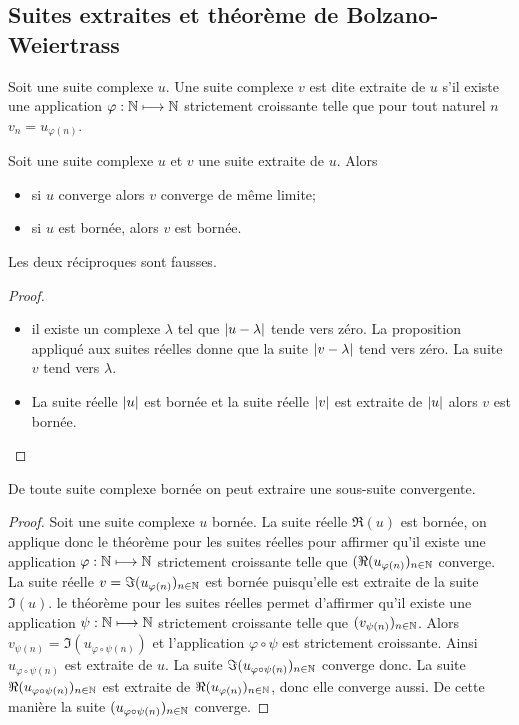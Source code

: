 \subsection{Suites extraites et théorème de Bolzano-Weiertrass}
\begin{defdef}
  Soit une suite complexe \(u\). Une suite complexe \(v\) est dite extraite de \(u\) s'il existe une application \(\varphi:\mathbb{N} \longmapsto \mathbb{N}\) strictement croissante telle que pour tout naturel \(n\) \(v_n = u_{\varphi(n)}\).
\end{defdef}
\begin{prop}
  Soit une suite complexe \(u\) et \(v\) une suite extraite de \(u\). Alors
  \begin{itemize}
  \item si \(u\) converge alors \(v\) converge de même limite;
  \item si \(u\) est bornée, alors \(v\) est bornée.
  \end{itemize}
  Les deux réciproques sont fausses.
\end{prop}
\begin{proof}
  \begin{itemize}
  \item il existe un complexe \(\lambda\) tel que \(\left\lvert u-\lambda\right\rvert\) tende vers zéro. La proposition appliqué aux suites réelles donne que la suite \(\left\lvert v-\lambda\right\rvert\) tend vers zéro. La suite \(v\) tend vers \(\lambda\).
  \item La suite réelle \(\left\lvert u\right\rvert\) est bornée et la suite réelle \(\left\lvert v\right\rvert\) est extraite de \(\left\lvert u\right\rvert\) alors \(v\) est bornée.
  \end{itemize}
\end{proof}
\begin{theo}
  De toute suite complexe bornée on peut extraire une sous-suite convergente.
\end{theo}
\begin{proof}
  Soit une suite complexe \(u\) bornée. La suite réelle \(\Re(u)\) est bornée, on applique donc le théorème pour les suites réelles pour affirmer qu'il existe une application \(\varphi:\mathbb{N} \longmapsto \mathbb{N}\) strictement croissante telle que \((\Re(u_{\varphi(n)})_{n \in \mathbb{N}}\) converge. La suite réelle \(v = \Im(u_{\varphi(n)})_{n \in \mathbb{N}}\) est bornée puisqu'elle est extraite de la suite \(\Im(u)\). le théorème pour les suites réelles permet d'affirmer qu'il existe une application \(\psi:\mathbb{N} \longmapsto \mathbb{N}\) strictement croissante telle que \((v_{\psi(n)})_{n \in \mathbb{N}}\). Alors \(v_{\psi(n)} = \Im(u_{\varphi \circ \psi(n)})\) et l'application \(\varphi \circ \psi\) est strictement croissante. Ainsi \(u_{\varphi \circ \psi(n)}\) est extraite de \(u\). La suite \(\Im(u_{\varphi \circ \psi(n)})_{n \in \mathbb{N}}\) converge donc. La suite \(\Re(u_{\varphi \circ \psi(n)})_{n \in \mathbb{N}}\) est extraite de \(\Re(u_{\varphi(n)})_{n \in \mathbb{N}}\), donc elle converge aussi. De cette manière la suite \((u_{\varphi \circ \psi(n)})_{n \in \mathbb{N}}\) converge.
\end{proof}


